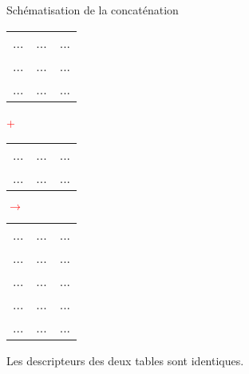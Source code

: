 \documentclass[10pt]{beamer}
\begin{document}
\begin{frame}
    \mframe{\FT}
    \begin{block}{Schématisation de la concaténation}
        \begin{center}
        \begin{tabular}{|c|c|c|}
            \hline
            \cellcolor{green!25}{\quad} & \cellcolor{green!25}{\quad} & \cellcolor{green!25}{\quad} \\
            \hline
             ... & ... & ... \\
            \hline
            ... & ... & ... \\
            \hline
            ... & ... & ... \\
            \hline
        \end{tabular} {\huge\textcolor{red}{+}} 
        \begin{tabular}{|c|c|c|}
            \hline
            \cellcolor{green!25}{\quad} & \cellcolor{green!25}{\quad} & \cellcolor{green!25}{\quad} \\
            \hline
             ... & ... & ... \\
            \hline
            ... & ... & ... \\
            \hline
        \end{tabular} {\huge\textcolor{red}{$\rightarrow$}} 
        \begin{tabular}{|c|c|c|}
            \hline
            \cellcolor{green!25}{\quad} & \cellcolor{green!25}{\quad} & \cellcolor{green!25}{\quad} \\
            \hline
             ... & ... & ... \\
            \hline
            ... & ... & ... \\
            \hline
            ... & ... & ... \\
            \hline
            ... & ... & ... \\
            \hline
            ... & ... & ... \\
            \hline
        \end{tabular}
    \end{center}
    Les descripteurs des deux tables sont identiques.
    \end{block}
\end{frame}
\end{document}
